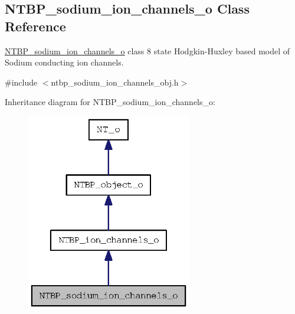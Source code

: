\subsection{NTBP\_\-sodium\_\-ion\_\-channels\_\-o Class Reference}
\label{class_n_t_b_p__sodium__ion__channels__o}


\hyperlink{class_n_t_b_p__sodium__ion__channels__o}{NTBP\_\-sodium\_\-ion\_\-channels\_\-o} class 8 state Hodgkin-\/Huxley based model of Sodium conducting ion channels.  




{\ttfamily \#include $<$ntbp\_\-sodium\_\-ion\_\-channels\_\-obj.h$>$}



Inheritance diagram for NTBP\_\-sodium\_\-ion\_\-channels\_\-o:
\nopagebreak
\begin{figure}[H]
\begin{center}
\leavevmode
\includegraphics[width=204pt]{class_n_t_b_p__sodium__ion__channels__o__inherit__graph}
\end{center}
\end{figure}



